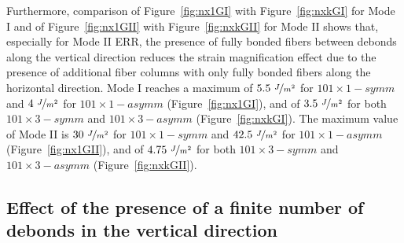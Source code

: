\documentclass[smallextended]{svjour3}       %
\begin{document}
Furthermore, comparison of Figure~\ref{fig:nx1GI} with Figure~\ref{fig:nxkGI} for Mode I and of Figure~\ref{fig:nx1GII} with Figure~\ref{fig:nxkGII} for Mode II shows that, especially for Mode II ERR, the presence of fully bonded fibers between debonds along the vertical direction reduces the strain magnification effect due to the presence of additional fiber columns with only fully bonded fibers along the horizontal direction. Mode I reaches a maximum of $5.5\ \nicefrac{J}{m^{2}}$ for $101\times 1-symm$ and $4\  \nicefrac{J}{m^{2}}$ for $101\times 1-asymm$ (Figure~\ref{fig:nx1GI}), and of $3.5\  \nicefrac{J}{m^{2}}$ for both $101\times 3-symm$ and $101\times 3-asymm$ (Figure~\ref{fig:nxkGI}). The maximum value of Mode II is $30\  \nicefrac{J}{m^{2}}$ for $101\times 1-symm$ and $42.5\  \nicefrac{J}{m^{2}}$ for $101\times 1-asymm$ (Figure~\ref{fig:nx1GII}), and of $4.75\  \nicefrac{J}{m^{2}}$ for both $101\times 3-symm$ and $101\times 3-asymm$ (Figure~\ref{fig:nxkGII}).%

\subsection{Effect of the presence of a finite number of debonds in the vertical direction}\label{subsec:finitenumdebonds}
\end{document}
